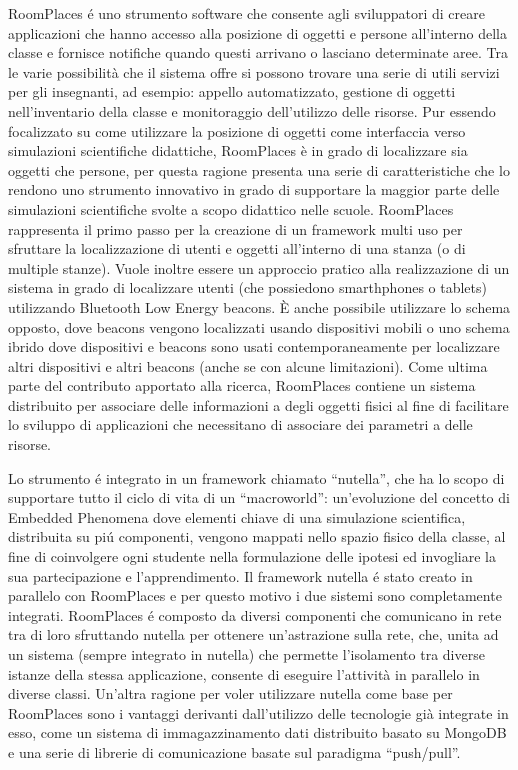 RoomPlaces é uno strumento software che consente agli sviluppatori di creare applicazioni che hanno accesso alla posizione di oggetti e persone all’interno della classe e fornisce notifiche quando questi arrivano o lasciano determinate aree. Tra le varie possibilità che il sistema offre si possono trovare una serie di utili servizi per gli insegnanti, ad esempio: appello automatizzato, gestione di oggetti nell’inventario della classe e monitoraggio dell’utilizzo delle risorse. Pur essendo focalizzato su come utilizzare la posizione di oggetti come interfaccia verso simulazioni scientifiche didattiche, RoomPlaces è in grado di localizzare sia oggetti che persone, per questa ragione presenta una serie di caratteristiche che lo rendono uno strumento innovativo in grado di supportare la maggior parte delle simulazioni scientifiche svolte a scopo didattico nelle scuole. RoomPlaces rappresenta il primo passo per la creazione di un framework multi uso per sfruttare la localizzazione di utenti e oggetti all’interno di una stanza (o di multiple stanze). Vuole inoltre essere un approccio pratico alla realizzazione di un sistema in grado di localizzare utenti (che possiedono smarthphones o tablets) utilizzando Bluetooth Low Energy beacons. È anche possibile utilizzare lo schema opposto, dove beacons vengono localizzati usando dispositivi mobili o uno schema ibrido dove dispositivi e beacons sono usati contemporaneamente per localizzare altri dispositivi e altri beacons (anche se con alcune limitazioni). Come ultima parte del contributo apportato alla ricerca, RoomPlaces contiene un sistema distribuito per associare delle informazioni a degli oggetti fisici al fine di facilitare lo sviluppo di applicazioni che necessitano di associare dei parametri a delle risorse.

Lo strumento é integrato in un framework chiamato “nutella”, che ha lo scopo di supportare tutto il ciclo di vita di un “macroworld”: un’evoluzione del concetto di Embedded Phenomena dove elementi chiave di una simulazione scientifica, distribuita su piú componenti, vengono mappati nello spazio fisico della classe, al fine di coinvolgere ogni studente nella formulazione delle ipotesi ed invogliare la sua partecipazione e l’apprendimento. Il framework nutella é stato creato in parallelo con RoomPlaces e per questo motivo i due sistemi sono completamente integrati. RoomPlaces é composto da diversi componenti che comunicano in rete tra di loro sfruttando nutella per ottenere un’astrazione sulla rete, che, unita ad un sistema (sempre integrato in nutella) che permette l’isolamento tra diverse istanze della stessa applicazione, consente di eseguire l’attività in parallelo in diverse classi. Un’altra ragione per voler utilizzare nutella come base per RoomPlaces sono i vantaggi derivanti dall’utilizzo delle tecnologie già integrate in esso, come un sistema di immagazzinamento dati distribuito basato su MongoDB e una serie di librerie di comunicazione basate sul paradigma “push/pull”.

